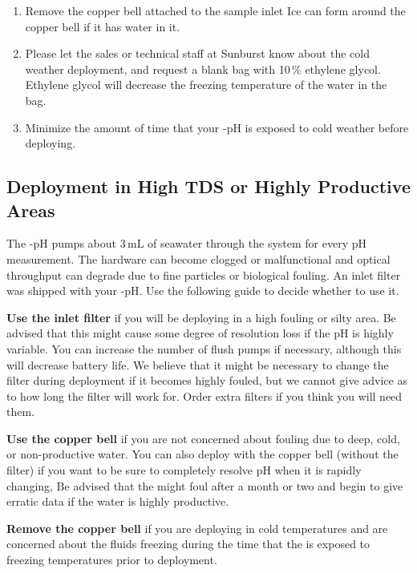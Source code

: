 \begin{enumerate}
\item
Remove the copper bell attached to the sample inlet \ifcase {}  \fi Ice can form around the copper bell if it has water in it.
\item
Please let the sales or technical staff at Sunburst know about the cold weather deployment, and request a blank bag with 10\,\% ethylene glycol. Ethylene glycol will decrease the freezing temperature of the water in the bag.
\item
Minimize the amount of time that your \instType{}-pH is exposed to cold weather before deploying.
\end{enumerate}

\or			%

\fi


\ifcase \inst	%

\subsection{Deployment in High TDS or Highly Productive Areas}

The \instType{}-pH pumps about 3\,mL of seawater through the system for every pH measurement.  The hardware can become clogged or malfunctional and optical throughput can degrade due to fine particles or biological fouling.  An inlet filter was shipped with your \instType{}-pH.  Use the following guide to decide whether to use it.

\textbf{Use the inlet filter} if you will be deploying in a high fouling or silty area.  Be advised that this might cause some degree of resolution loss if the pH is highly variable.  You can increase the number of flush pumps if necessary, although this will decrease battery life.  We believe that it might be necessary to change the filter during deployment if it becomes highly fouled, but we cannot give advice as to how long the filter will work for.  Order extra filters if you think you will need them.

\textbf{Use the copper bell} if you are not concerned about fouling due to deep, cold, or non-productive water.  You can also deploy with the copper bell (without the filter) if you want to be sure to completely resolve pH when it is rapidly changing,  Be advised that the \instType{} might foul after a month or two and begin to give erratic data if the water is highly productive.

\textbf{Remove the copper bell} if you are deploying in cold temperatures and are concerned about the \instType{} fluids freezing during the time that the \instType{} is exposed to freezing temperatures prior to deployment.

